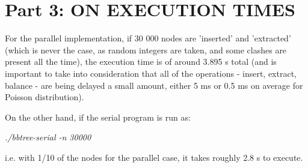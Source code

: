 \documentclass[paper=a4, fontsize=11pt]{scrartcl} %
\numberwithin{equation}{section} %
\numberwithin{figure}{section} %
\numberwithin{table}{section} %
\begin{document}
\newpage

\section{Part 3: ON EXECUTION TIMES}

For the parallel implementation, if 30 000 nodes are 'inserted' and 'extracted' (which is never the case, as random integers are taken, and some clashes are present all the time), the execution time is of around 3.895 s total (and is important to take into consideration that all of the operations - insert, extract, balance - are being delayed a small amount, either 5 ms or 0.5 ms on average for Poisson distribution).

On the other hand, if the serial program is run as:

\begin{center}
\textit{./bbtree-serial -n 30000}
\end{center}

i.e. with 1/10 of the nodes for the parallel case, it takes roughly 2.8 s to execute.
\end{document}
